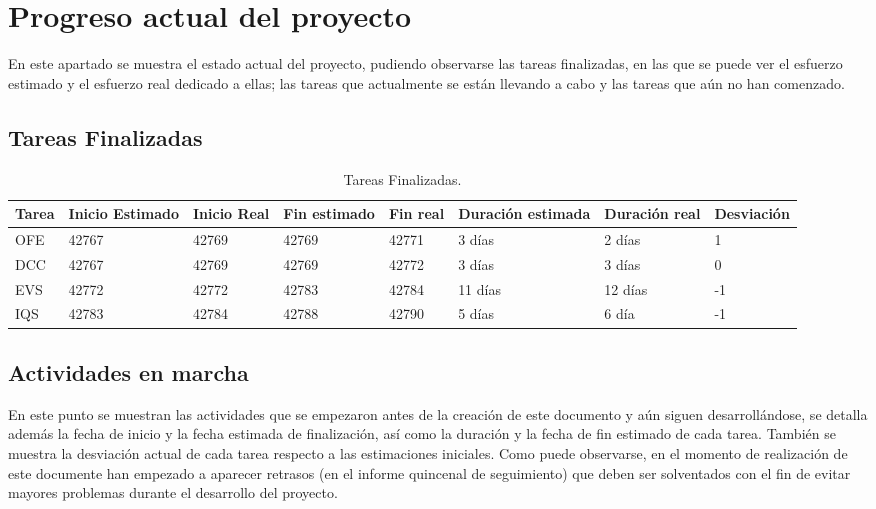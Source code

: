 \section{Progreso actual del proyecto}

\par En este apartado se muestra el estado actual del proyecto, pudiendo observarse las tareas finalizadas, en las que se puede ver el esfuerzo estimado y el esfuerzo real dedicado a ellas; las tareas que actualmente se están llevando a cabo y las tareas que aún no han comenzado.

\subsection{Tareas Finalizadas}
\begin{table}[h]
\begin{center}
\begin{tabular}{ l l l l l l l l }
\hline
	Tarea & Inicio Estimado & Inicio Real & Fin estimado & Fin real & Duración estimada & Duración real & Desviación \\ \hline \hline
	OFE & 42767 & 42769 & 42769 & 42771 & 3 días & 2 días & 1 \\ \hline
	DCC & 42767 & 42769 & 42769 & 42772 & 3 días & 3 días  & 0 \\ \hline
	EVS & 42772 & 42772 & 42783 & 42784 & 11 días & 12 días & -1 \\ \hline
	IQS & 42783 & 42784 & 42788 & 42790 & 5 días & 6 día & -1 \\ \hline
\end{tabular}
\caption{Tareas Finalizadas.}
\label{tab:Tareas Finalizadas}
\end{center}
\end{table}

\subsection{Actividades en marcha}
\par En este punto se muestran las actividades que se empezaron antes de la creación de este documento y aún siguen desarrollándose, se detalla además la fecha de inicio y la fecha estimada de finalización, así como la duración y la fecha de fin estimado de cada tarea. También se muestra la desviación actual de cada tarea respecto a las estimaciones iniciales. Como puede observarse, en el momento de realización de este documente han empezado a aparecer retrasos (en el informe quincenal de seguimiento) que deben ser solventados con el fin de evitar mayores problemas durante el desarrollo del proyecto.

